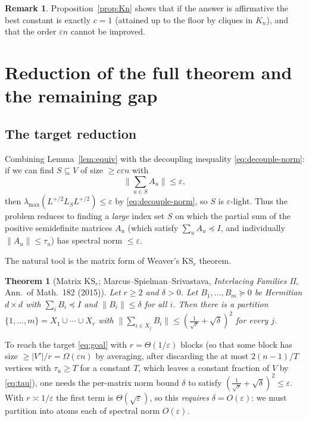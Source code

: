 \documentclass[12pt]{article}
\newtheorem{theorem}{Theorem}
\theoremstyle{definition}
\newtheorem{remark}{Remark}
\newcommand{\eps}{\varepsilon}
\newcommand{\psd}{\succeq 0}
\begin{document}
\begin{remark}
Proposition~\ref{prop:Kn} shows that if the answer is affirmative the best constant is exactly $c=1$
(attained up to the floor by cliques in $K_n$), and that the order $\eps n$ cannot be improved.
\end{remark}

\section{Reduction of the full theorem and the remaining gap}\label{sec:reduce}

\subsection*{The target reduction}

Combining Lemma~\ref{lem:equiv} with the decoupling inequality \eqref{eq:decouple-norm}: if we can
find $S\subseteq V$ of size $\ge c\eps n$ with
\begin{equation}\label{eq:goal}
\Big\|\sum_{u\in S}A_u\Big\|\le\eps,
\end{equation}
then $\lambda_{\max}(L^{+/2}L_SL^{+/2})\le\eps$ by \eqref{eq:decouple-norm}, so $S$ is $\eps$-light.
Thus the problem reduces to finding a \emph{large} index set $S$ on which the partial sum of the
positive semidefinite matrices $A_u$ (which satisfy $\sum_u A_u\preceq I$, and individually
$\|A_u\|\le\tau_u$) has spectral norm $\le\eps$.

The natural tool is the matrix form of Weaver's $\mathrm{KS}_r$ theorem.

\begin{theorem}[Matrix $\mathrm{KS}_r$; Marcus--Spielman--Srivastava, \emph{Interlacing Families II},
Ann.\ of Math.\ 182 (2015)]\label{thm:KS}
Let $r\ge2$ and $\delta>0$. Let $B_1,\dots,B_m\psd$ be Hermitian $d\times d$ with $\sum_i B_i\preceq I$
and $\|B_i\|\le\delta$ for all $i$. Then there is a partition $\{1,\dots,m\}=X_1\cup\cdots\cup X_r$
with $\big\|\sum_{i\in X_j}B_i\big\|\le(\tfrac1{\sqrt r}+\sqrt\delta)^2$ for every $j$.
\end{theorem}

To reach the target \eqref{eq:goal} with $r=\Theta(1/\eps)$ blocks (so that some block has size
$\ge|V'|/r=\Omega(\eps n)$ by averaging, after discarding the at most $2(n-1)/T$ vertices with
$\tau_u\ge T$ for a constant $T$, which leaves a constant fraction of $V$ by \eqref{eq:tau}), one needs
the per-matrix norm bound $\delta$ to satisfy $(\tfrac1{\sqrt r}+\sqrt\delta)^2\le\eps$. With
$r\asymp 1/\eps$ the first term is $\Theta(\sqrt\eps)$, so this \emph{requires} $\delta=O(\eps)$: we
must partition into atoms each of spectral norm $O(\eps)$.
\end{document}

